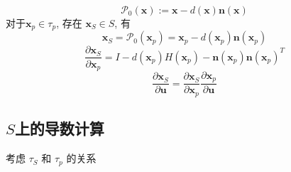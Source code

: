 \documentclass{article}
\begin{document}
\begin{equation*}
\mathcal P_0(\mathbf x):=\mathbf x - d(\mathbf x)\mathbf n(\mathbf x)
\end{equation*}
对于$\mathbf x_p \in \tau_p$, 存在 $\mathbf x_S \in S$, 有
\begin{equation*}
\mathbf x_S = \mathcal P_0(\mathbf x_p)=\mathbf x_p - d(\mathbf x_p)\mathbf n(\mathbf x_p)
\end{equation*}
\begin{equation*}
\frac{\partial \mathbf x_S}{\partial\mathbf x_p} = I - d(\mathbf x_p) H(\mathbf x_p) - \mathbf n(\mathbf x_p)\mathbf n(\mathbf x_p)^T
\end{equation*}
\begin{equation*}
\frac{\partial \mathbf x_S}{\partial\mathbf u} = \frac{\partial \mathbf x_S}{\partial\mathbf x_p}\frac{\partial \mathbf x_p}{\partial\mathbf u}
\end{equation*}

\subsection{$S$上的导数计算}

考虑 $\tau_S$ 和 $\tau_p$ 的关系
\end{document}
